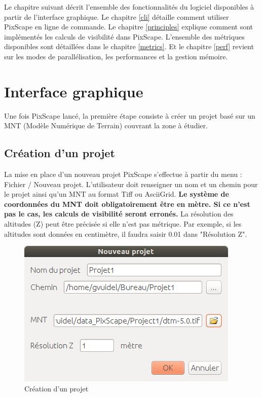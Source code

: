 \documentclass{report}
\begin{document}
Le chapitre suivant décrit l'ensemble des fonctionnalités du logiciel disponibles à partir de l'interface graphique. Le chapitre \ref{cli} détaille comment utiliser PixScape en ligne de commande. Le chapitre \ref{principles} explique comment sont implémentés les calculs de visibilité dans PixScape. L'ensemble des métriques disponibles sont détaillées dans le chapitre \ref{metrics}. Et le chapitre \ref{perf} revient sur les modes de parallélisation, les performances et la gestion mémoire.




\chapter{Interface graphique}
\label{gui}

Une fois PixScape lancé, la première étape consiste à créer un projet basé sur un MNT (Modèle Numérique de Terrain) couvrant la zone à étudier.

\section{Création d'un projet}

La mise en place d’un nouveau projet PixScape s’effectue à partir du menu : Fichier / Nouveau projet. L’utilisateur doit renseigner un nom et un chemin pour le projet ainsi qu'un MNT au format Tiff ou AsciiGrid. \textbf{Le système de coordonnées du MNT doit obligatoirement être en mètre. Si ce n'est pas le cas, les calculs de visibilité seront erronés.} La résolution des altitudes (Z) peut être précisée si elle n'est pas métrique. Par exemple, si les altitudes sont données en centimètre, il faudra saisir 0.01 dans "Résolution Z".

\begin{figure}[H]
	\includegraphics[scale=0.5]{img/new_project-fr.png} 
	\caption{Création d'un projet}
\end{figure}
\end{document}
